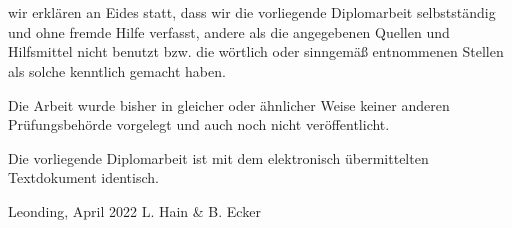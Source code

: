\thispagestyle{empty}
\vspace{3cm}
~ \\ \\
wir erklären an Eides statt, dass wir die vorliegende Diplomarbeit selbstständig und ohne fremde Hilfe verfasst, andere als die angegebenen Quellen und Hilfsmittel nicht benutzt bzw. die wörtlich oder sinngemäß entnommenen Stellen als solche kenntlich gemacht haben.

Die Arbeit wurde bisher in gleicher oder ähnlicher Weise keiner anderen Prüfungsbehörde vorgelegt und auch noch nicht veröffentlicht.

Die vorliegende Diplomarbeit ist mit dem elektronisch übermittelten Textdokument identisch.
\vspace{3cm}
\begin{tabbing}
Leonding, April 2022 \hspace{5cm} L. Hain \& B. Ecker
\end{tabbing}
\vspace{10cm}
\newpage
\setcounter{page}{1}
